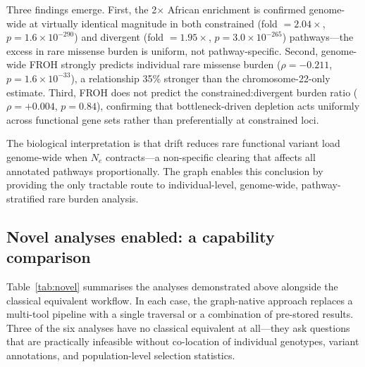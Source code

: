 Three findings emerge. First, the 2$\times$ African enrichment is confirmed genome-wide at virtually identical magnitude in both constrained (fold $= 2.04\times$, $p = 1.6 \times 10^{-290}$) and divergent (fold $= 1.95\times$, $p = 3.0 \times 10^{-265}$) pathways---the excess in rare missense burden is uniform, not pathway-specific. Second, genome-wide FROH strongly predicts individual rare missense burden ($\rho = -0.211$, $p = 1.6 \times 10^{-33}$), a relationship 35\% stronger than the chromosome-22-only estimate. Third, FROH does not predict the constrained:divergent burden ratio ($\rho = +0.004$, $p = 0.84$), confirming that bottleneck-driven depletion acts uniformly across functional gene sets rather than preferentially at constrained loci.

The biological interpretation is that drift reduces rare functional variant load genome-wide when $N_e$ contracts---a non-specific clearing that affects all annotated pathways proportionally. The graph enables this conclusion by providing the only tractable route to individual-level, genome-wide, pathway-stratified rare burden analysis.

\subsection*{Novel analyses enabled: a capability comparison}

Table~\ref{tab:novel} summarises the analyses demonstrated above alongside the classical equivalent workflow. In each case, the graph-native approach replaces a multi-tool pipeline with a single traversal or a combination of pre-stored results. Three of the six analyses have no classical equivalent at all---they ask questions that are practically infeasible without co-location of individual genotypes, variant annotations, and population-level selection statistics.

